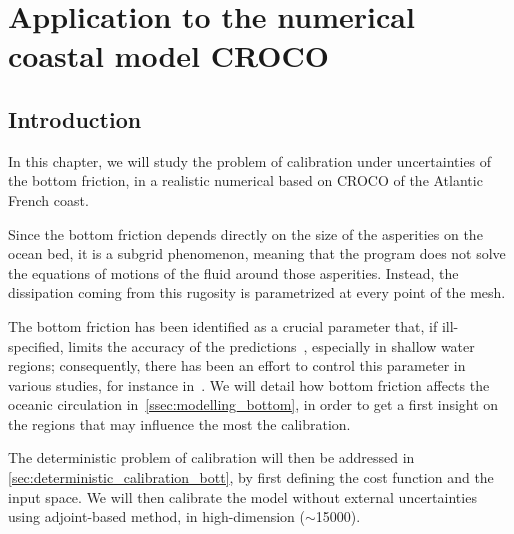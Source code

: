 \documentclass[../../Main_ManuscritThese.tex]{subfiles}
\newcommand{\CROCO}{CROCO}
\begin{document}
\chapter{Application to the numerical coastal model \CROCO}
\label{chap:croco}
\minitoc
\newpage
\subfileLocal{\pagestyle{contentStyle}}

\section{Introduction}
\label{sec:intro_croco}


In this chapter, we will study the problem of calibration under
uncertainties of the bottom friction, in a realistic numerical based
on \CROCO{} of the Atlantic French coast.

Since the bottom friction depends directly on the size of the
asperities on the ocean bed, it is a subgrid phenomenon, meaning that
the program does not solve the equations of motions of the fluid
around those asperities. Instead, the dissipation coming from this
rugosity is parametrized at every point of the mesh.

The bottom friction has been identified as a crucial parameter that,
if ill-specified, limits the accuracy of the
predictions~\citep{sinha_principal_1997,kreitmair_effect_2019},
especially in shallow water regions; consequently, there has been an
effort to control this parameter in various
studies, for instance in~\cite{das_variational_1992,das_estimation_1991,boutet_estimation_2015}.
We will detail how bottom friction affects the oceanic circulation
in~\cref{ssec:modelling_bottom}, in order to get a first insight on
the regions that may influence the most the calibration.

The deterministic problem of calibration will then be addressed in
\cref{sec:deterministic_calibration_bott}, by first defining the cost
function and the input space. We will then calibrate the model without
external uncertainties using adjoint-based method, in high-dimension
($\sim$\num{15000}).
\end{document}
